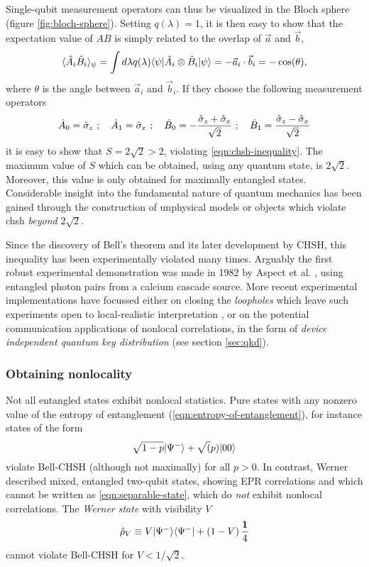 Single-qubit measurement operators can thus be visualized in the Bloch sphere (figure \ref{fig:bloch-sphere}).
Setting $q(\lambda)=1$, it is then easy to show that the expectation value of $AB$ is simply related to the overlap of $\vec{a}$ and $\vec{b}$,
\begin{equation}
    \langle \hat{A}_i \hat{B}_i \rangle_{\psi} = \int d \lambda q(\lambda) \mbox{$ \langle \psi | $} \hat{A}_i \otimes \hat{B}_i  \mbox{$ | \psi \rangle $} = - \vec{a}_i \cdot \vec{b}_i = -\cos(\theta),
\end{equation}
where $\theta$ is the angle between $\vec{a}_i$ and $\vec{b}_i$.
If they choose the following measurement operators
\begin{equation}
\hat{A}_0 = \hat{\sigma}_z ~ ; ~~~
\hat{A}_1 = \hat{\sigma}_x ~ ; ~~~
\hat{B}_0 = -\frac{\hat{\sigma}_z+\hat{\sigma}_x}{\sqrt{2}} ~ ; ~~~
\hat{B}_1 = \frac{\hat{\sigma}_z-\hat{\sigma}_x}{\sqrt{2}}
\end{equation}
it is easy to show that $S=2\sqrt{2} > 2$, violating \ref{eqn:chsh-inequality}. The maximum value of $S$ which can be obtained, using any quantum state, is $2\sqrt{2}$. Moreover, this value is only obtained for maximally entangled states. Considerable insight into the fundamental nature of quantum mechanics has been gained \cite{Popescu1994, Tsirelson1993, Brunner2013} through the construction of unphysical models or objects which violate \gls{chsh} \emph{beyond} $2\sqrt{2}$.

Since the discovery of Bell's theorem and its later development by CHSH, this inequality has been experimentally violated many times. 
Arguably the first robust experimental demonstration was made in 1982 by Aspect et al. \cite{Aspect1982c}, using entangled photon pairs from a calcium cascade source. 
More recent experimental implementations have focussed either on closing the \emph{loopholes} which leave such experiments open to local-realistic interpretation \cite{Giustina2013, Scheidl2010}, or on the potential communication applications of nonlocal correlations, in the form of \emph{device independent quantum key distribution} (see section \ref{sec:qkd}). 

\subsubsection{Obtaining nonlocality}
Not all entangled states exhibit nonlocal statistics. Pure states with any nonzero value of the entropy of entanglement (\ref{eqn:entropy-of-entanglement}), for instance states of the form
\begin{equation}
     \sqrt{1-p} \mbox{$ | \Psi^- \rangle $} + \sqrt(p) \mbox{$ | 00 \rangle $} 
\end{equation}
violate Bell-CHSH (although not maximally) for all $p>0$. In contrast, Werner \cite{Werner1989} described mixed, entangled two-qubit states, showing EPR correlations and which cannot be written as \ref{eqn:separable-state}, which do \emph{not} exhibit nonlocal correlations. The \emph{Werner state} with visibility $V$
\begin{equation}
    \hat{\rho}_V \equiv V\mbox{$ | \Psi^- \rangle $} \mbox{$ \langle \Psi^- | $} + \left(1-V\right) \frac{\mathbf{1}}{4}
    \label{eqn:werner-state}
\end{equation}
cannot violate Bell-CHSH for $V<1/\sqrt{2}$. 

